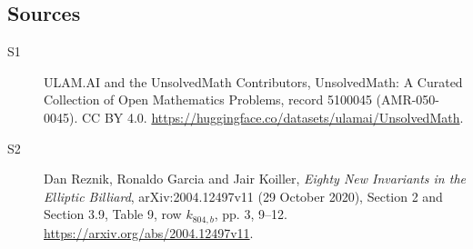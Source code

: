 \documentclass[11pt]{article}
\begin{document}
\subsection{Sources}
\begin{description}
\item[\hypertarget{source:5100045:1}{S1}] ULAM.AI and the UnsolvedMath Contributors, UnsolvedMath: A Curated Collection of Open Mathematics Problems, record 5100045 (AMR-050-0045). CC BY 4.0. \url{https://huggingface.co/datasets/ulamai/UnsolvedMath}.
\item[\hypertarget{source:5100045:2}{S2}] Dan Reznik, Ronaldo Garcia and Jair Koiller, \emph{Eighty New Invariants in the Elliptic Billiard}, arXiv:2004.12497v11 (29 October 2020), Section 2 and Section 3.9, Table 9, row $k_{804,b}$, pp. 3, 9--12. \url{https://arxiv.org/abs/2004.12497v11}.
\end{description}
\label{end:5100045}
\end{document}
